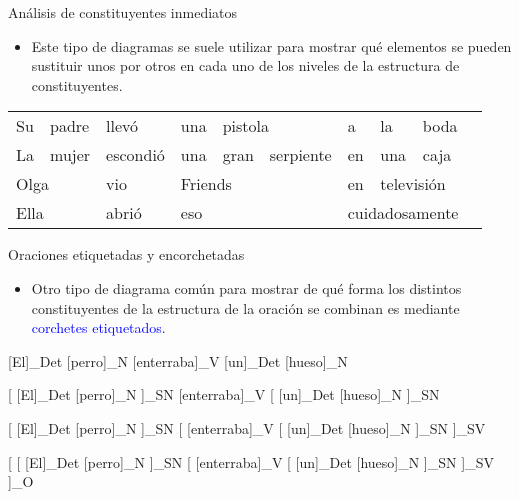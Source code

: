 \documentclass{beamer}
\begin{document}
\begin{frame}{Análisis de constituyentes inmediatos}

\begin{itemize}
	\item Este tipo de diagramas se suele utilizar para mostrar qué elementos se pueden sustituir unos por otros en cada uno de los niveles de la estructura de constituyentes.
\end{itemize}

\begin{center}
\begin{tabular}{|l|l|l|l|l|l|l|l|l|l|}
\hline 
Su & padre & llevó & una & \multicolumn{2}{|l|}{pistola} & a & la & boda \\
\cline{5-6} 
La & mujer & escondió & una & gran & serpiente & en & una & caja \\ 
\cline{1-2} 
\cline{4-6} 
\cline{8-9} 
\multicolumn{2}{|l|}{Olga} & vio & \multicolumn{3}{|l|}{Friends} & en & \multicolumn{2}{|l|}{televisión} \\
\cline{7-9} 
\multicolumn{2}{|l|}{Ella} & abrió & \multicolumn{3}{|l|}{eso} & \multicolumn{3}{|l|}{cuidadosamente} \\
\hline 
\end{tabular}
\end{center}

\end{frame}

\begin{frame}{Oraciones etiquetadas y encorchetadas}

\begin{itemize}
	\item Otro tipo de diagrama común para mostrar de qué forma los distintos constituyentes de la estructura de la oración se combinan es mediante \textcolor{blue}{corchetes etiquetados}.
\end{itemize}

	\pause
	
	[El]_{Det} [perro]_{N} [enterraba]_{V} [un]_{Det} [hueso]_{N}

	\hspace{0.2cm}
	\pause
	
	[ [El]_{Det} [perro]_{N} ]_{SN} [enterraba]_{V} [ [un]_{Det} [hueso]_{N} ]_{SN}
	
	\hspace{0.2cm}
	\pause
	
	[ [El]_{Det} [perro]_{N} ]_{SN} [ [enterraba]_{V} [ [un]_{Det} [hueso]_{N} ]_{SN} ]_{SV}

	\hspace{0.2cm}
	\pause
	
	[ [ [El]_{Det} [perro]_{N} ]_{SN} [ [enterraba]_{V} [ [un]_{Det} [hueso]_{N} ]_{SN} ]_{SV} ]_{O}
\end{frame}
\end{document}
